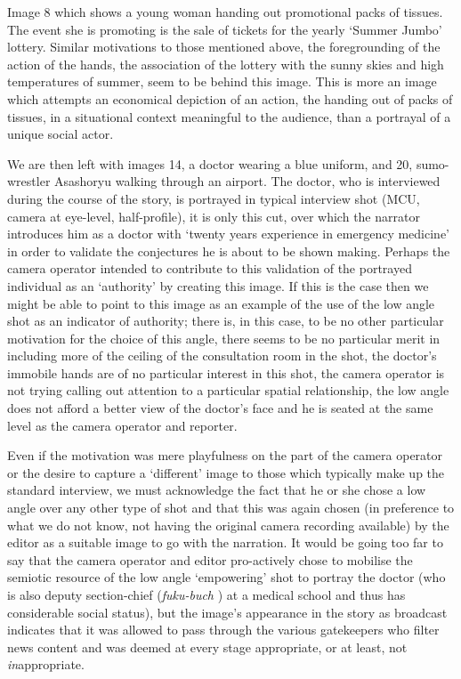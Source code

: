 \bigskip
Image 8 which shows a young woman handing out promotional packs of tissues. The event she is promoting is the sale of tickets for the yearly `Summer Jumbo' lottery. Similar motivations to those mentioned above, the foregrounding of the action of the hands, the association of the lottery with the sunny skies and high temperatures of summer, seem to be behind this image. This is more an image which attempts an economical depiction of an action, the handing out of packs of tissues, in a situational context meaningful to the audience, than a portrayal of a unique social actor.

We are then left with images 14, a doctor wearing a blue uniform, and 20, sumo-wrestler Asashoryu walking through an airport. The doctor, who is interviewed during the course of the story, is portrayed in typical interview shot (MCU, camera at eye-level, half-profile), it is only this cut, over which the narrator introduces him as a doctor with `twenty years experience in emergency medicine' in order to validate the conjectures he is about to be shown making. Perhaps the camera operator intended to contribute to this validation of the portrayed individual as an `authority' by creating this image. If this is the case then we might be able to point to this image as an example of the use of the low angle shot as an indicator of authority; there is, in this case, to be no other particular motivation for the choice of this angle, there seems to be no particular merit in including more of the ceiling of the consultation room in the shot, the doctor's immobile hands are of no particular interest in this shot, the camera operator is not trying calling out attention to a particular spatial relationship, the low angle does not afford a better view of the doctor's face and he is seated at the same level as the camera operator and reporter.

Even if the motivation was mere playfulness on the part of the camera operator or the desire to capture a `different' image to those which typically make up the standard interview, we must acknowledge the fact that he or she chose a low angle over any other type of shot and that this was again chosen (in preference to what we do not know, not having the original camera recording available) by the editor as a suitable image to go with the narration. It  would be going too far to say that the camera operator and editor pro-actively chose to mobilise the semiotic resource of the low angle `empowering' shot to portray the doctor (who is also deputy section-chief (\emph{fuku-buch} ) at a medical school and thus has considerable social status), but the image's appearance in the story as broadcast indicates that it was allowed to pass through the various gatekeepers who filter news content and was deemed at every stage appropriate, or at least, not \textit{in}appropriate.

